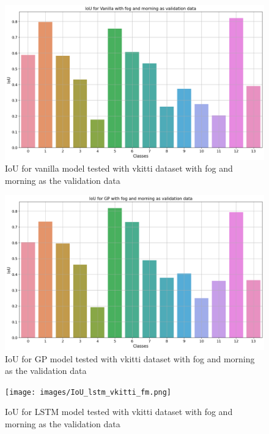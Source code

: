 	\begin{figure}
		\centering
	
		\includegraphics[width=13cm]{images/IoU_vanilla_vkitti_fm.png}
		\caption{IoU for vanilla model tested with vkitti dataset with fog and morning as the validation data}
		\label{fig:performance_metric_vkitti_two_class_box_plot}
	\end{figure}

	\begin{figure}
		\centering
	
		\includegraphics[width=13cm]{images/IoU_gp_vkitti_fm.png}
		\caption{IoU for GP model tested with vkitti dataset with fog and morning as the validation data}
		\label{fig:performance_metric_vkitti_two_class_box_plot}
	\end{figure}

	\begin{figure}
		\centering
	
		\texttt{[image: images/IoU\_lstm\_vkitti\_fm.png]}
		\caption{IoU for LSTM model tested with vkitti dataset with fog and morning as the validation data}
		\label{fig:performance_metric_vkitti_two_class_box_plot}
	\end{figure}	
	
